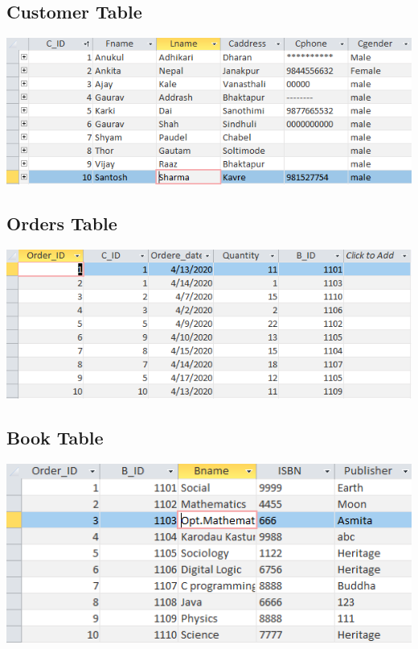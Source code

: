 \documentclass[17pt,a4paper,oneside,margin=1in]{article}
\begin{document}
\subsection{Customer Table}
\includegraphics[width=1\textwidth]{./scrot/customer.png}

\subsection{Orders Table}
\includegraphics[width=1\textwidth]{./scrot/order.png}

\subsection{Book Table}
\includegraphics[width=1\textwidth]{./scrot/book.png}
\end{document}
